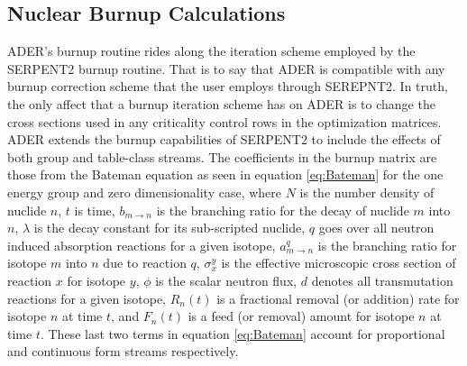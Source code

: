 \subsection{Nuclear Burnup Calculations}\label{ssec:burn}
ADER's burnup routine rides along the iteration scheme employed by the SERPENT2
burnup routine. That is to say that ADER is compatible with any burnup
correction scheme that the user employs through SEREPNT2. In truth, the only
affect that a burnup iteration scheme has on ADER is to change the cross
sections used in any criticality control rows in the optimization matrices.
ADER extends the burnup capabilities of SERPENT2 to include the effects
of both group and table-class streams.
The coefficients in the burnup
matrix are those from the Bateman equation as seen in equation
\ref{eq:Bateman} for the one energy group and zero 
dimensionality case, where $N$ is the number density of nuclide $n$,
$t$ is time, $b_{m \to n}$ is the branching ratio for the decay of 
nuclide $m$ into $n$, $\lambda$ is the decay constant
for its sub-scripted nuclide,
$q$ goes over all neutron induced absorption reactions for a given isotope, 
$a_{m \to n}^{q}$ is the branching ratio for isotope $m$ into $n$ due to
reaction $q$, $\sigma_{x}^{y}$ is the effective microscopic
cross section of reaction $x$ for isotope $y$, $\phi$ is the
scalar neutron flux, $d$ denotes all
transmutation reactions for a given isotope, $R_{n}(t)$ is a
fractional removal (or addition) rate for isotope $n$ at
time $t$, and $F_{n}(t)$ is a feed (or removal) amount for isotope
$n$ at time $t$. These last two terms in equation \ref{eq:Bateman}
account for proportional and continuous form streams
respectively.

